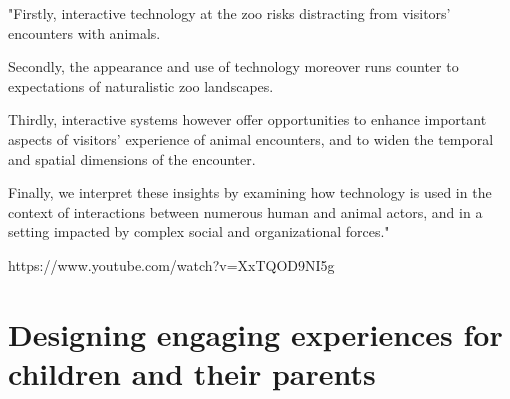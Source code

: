 "Firstly, interactive technology at the zoo risks distracting from visitors' encounters with animals.

Secondly, the appearance and use of technology moreover runs counter to expectations of naturalistic zoo landscapes. 

Thirdly, interactive systems however offer opportunities to enhance important aspects of visitors' experience of animal encounters, and to widen the temporal and spatial dimensions of the encounter. 

Finally, we interpret these insights by examining how technology is used in the context of interactions between numerous human and animal actors, and in a setting impacted by complex social and organizational forces."

https://www.youtube.com/watch?v=XxTQOD9NI5g

\section{Designing engaging experiences for children and their parents}

